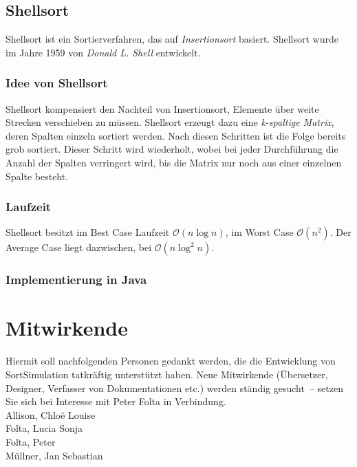 \documentclass[german]{pfBook}
\newcommand{\OO}{\mathcal{O}}
\begin{document}
	
	
	\subsection{Shellsort}
	
	Shellsort ist ein Sortierverfahren, das auf \emph{Insertionsort} basiert. Shellsort wurde im Jahre 1959 von \emph{Donald L. Shell} entwickelt.
	
	\subsubsection{Idee von Shellsort}
	
	Shellsort kompensiert den Nachteil von Insertionsort, Elemente über weite Strecken verschieben zu müssen. Shellsort erzeugt dazu eine \emph{k-spaltige Matrix}, deren Spalten einzeln sortiert werden. Nach diesen Schritten ist die Folge bereits grob sortiert. Dieser Schritt wird wiederholt, wobei bei jeder Durchführung die Anzahl der Spalten verringert wird, bis die Matrix nur noch aus einer einzelnen Spalte besteht.
	
	\subsubsection{Laufzeit}
	
	Shellsort besitzt im Best Case Laufzeit $\OO(n \log n)$, im Worst Case $\OO(n^2)$. Der Average Case liegt dazwischen, bei $\OO(n \log^2 n)$.
	
	\subsubsection{Implementierung in Java}
	
	
	
	\section{Mitwirkende}
	
	Hiermit soll nachfolgenden Personen gedankt werden, die die Entwicklung von SortSimulation tatkräftig unterstützt haben. Neue Mitwirkende (Übersetzer, Designer, Verfasser von Dokumentationen etc.) werden ständig gesucht~-- setzen Sie sich bei Interesse mit Peter Folta in Verbindung.\\
	[\baselineskip]
	Allison, Chloë Louise\\
	Folta, Lucia Sonja\\
	Folta, Peter\\
	Müllner, Jan Sebastian
	
\end{document}
